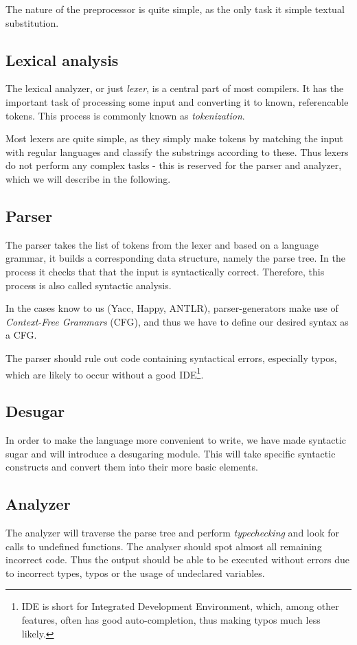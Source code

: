 The nature of the preprocessor is quite simple, as the only task it
simple textual substitution.

\subsection{Lexical analysis}
The lexical analyzer, or just \emph{lexer}, is a central part of most
compilers. It has the important task of processing some input and
converting it to known, referencable tokens. This process is commonly
known as \emph{tokenization}.

Most lexers are quite simple, as they simply make tokens by matching the input with regular languages and classify the substrings according to these. Thus lexers do not perform any complex tasks - this is reserved for the parser and analyzer, which we will describe in the following.


\subsection{Parser}
The parser takes the list of tokens from the lexer and based on a
language grammar, it builds a corresponding data structure, namely the
parse tree. In the process it checks that that the input is
syntactically correct. Therefore, this process is also called syntactic
analysis.

In the cases know to us (Yacc, Happy, ANTLR), parser-generators make use of \emph{Context-Free Grammars} (CFG), and thus we have to define our desired syntax as a CFG.

The parser should rule out code containing syntactical errors, especially typos, which are likely to occur without a good IDE\footnote{IDE is short for Integrated Development Environment, which, among other features, often has good auto-completion, thus making typos much less likely.}.

\subsection{Desugar}
In order to make the language more convenient to write, we have made syntactic sugar and will introduce a desugaring module. This will take specific syntactic constructs and convert them into their more basic elements.

\subsection{Analyzer}
The analyzer will traverse the parse tree and perform \emph{typechecking} and look for calls to undefined functions. The analyser should spot almost all remaining incorrect code. Thus the output should be able to be executed without errors due to incorrect types, typos or the usage of undeclared variables.

